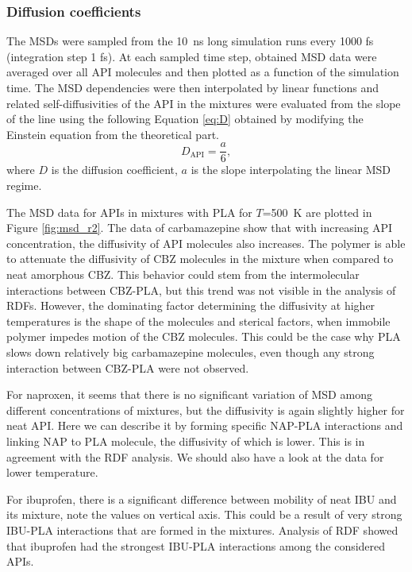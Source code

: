 \newpage
\subsubsection{Diffusion coefficients}
The MSDs were sampled from the 10~ns long simulation runs every 1000 fs (integration step 1 fs). At each sampled time step, obtained MSD data were averaged over all API molecules and then plotted as a function of the simulation time. The MSD dependencies were then interpolated by linear functions and related self-diffusivities of the API in the mixtures were evaluated from the slope of the line using the following Equation \ref{eq:D} obtained by modifying the Einstein equation from the theoretical part.
\vspace{-0.25cm}
\begin{equation}\label{eq:D}
	D_{\text{API}} = \frac{a}{6}, 
\end{equation}
where $D$ is the diffusion coefficient, $a$ is the slope interpolating the linear MSD regime.

The MSD data for APIs in mixtures with PLA for $T$=500~K are plotted in Figure \ref{fig:msd_r2}. The data of carbamazepine show that with increasing API concentration, the diffusivity of API molecules also increases. The polymer is able to attenuate the diffusivity of CBZ molecules in the mixture when compared to neat amorphous CBZ. This behavior could stem from the intermolecular interactions between CBZ-PLA, but this trend was not visible in the analysis of RDFs. However, the dominating factor determining the diffusivity at higher temperatures is the shape of the molecules and sterical factors, when immobile polymer impedes motion of the CBZ molecules. This could be the case why PLA slows down relatively big carbamazepine molecules, even though any strong interaction between CBZ-PLA were not observed. 

For naproxen, it seems that there is no significant variation of MSD among different concentrations of mixtures, but the diffusivity is again slightly higher for neat API. Here we can describe it by forming specific NAP-PLA interactions and linking NAP to PLA molecule, the diffusivity of which is lower. This is in agreement with the RDF analysis. We should also have a look at the data for lower temperature.

For ibuprofen, there is a significant difference between mobility of neat IBU and its mixture, note the values on vertical axis. This could be a result of very strong IBU-PLA interactions that are formed in the mixtures. Analysis of RDF showed that ibuprofen had the strongest IBU-PLA interactions among the considered APIs.

